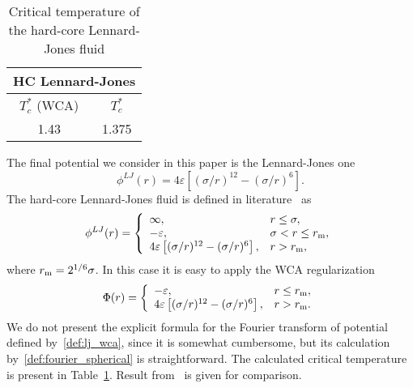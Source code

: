 \begin{table}[h]
	\noindent\caption{Critical temperature of the hard-core Lennard-Jones fluid}\vskip3mm
	\begin{tabular}{|c|c|}
		\hline
		\multicolumn{2}{|c|}{HC Lennard-Jones}\\
		\hline
		$T_c^*$ (WCA) & $T_c^*$ \cite{SowersStanley1991} \\
		\hline
		1.43 & 1.375 \\
		\hline
	\end{tabular}
	\label{tab:lj_temp_cr}
\end{table}

The final potential we consider in this paper is the Lennard-Jones one
\begin{equation*}
	\phi^{LJ}(r) = 4\varepsilon \left[(\sigma/r)^{12} - (\sigma/r)^6\right].
\end{equation*}
The hard-core Lennard-Jones fluid is defined in literature~\cite{SowersStanley1991,DiezLargoSolana2010} as
\begin{equation*}
	\phi^{LJ}(r) = \left\{
	\begin{array}{llll}
		\infty, & r\leq \sigma,
		\\
		-\varepsilon, & \sigma < r \leq r_{\rm m}, 
		\\
		4\varepsilon \left[(\sigma/r)^{12} - (\sigma/r)^6\right], & r > r_{\rm m},
	\end{array}
	\right.
\end{equation*}
where $r_{\rm m}=2^{1/6}\sigma$.
In this case it is easy to apply the WCA regularization
\begin{equation}
	\label{def:lj_wca}
	\Phi(r) = \left\{
	\begin{array}{ll}
		-\varepsilon, & r \leq r_{\rm m},
		\\
		4\varepsilon \left[(\sigma/r)^{12} - (\sigma/r)^6\right], & r > r_{\rm m}.
	\end{array}	
	\right.
\end{equation}
We do not present the explicit formula for the Fourier transform of potential defined by~\eqref{def:lj_wca}, since it is somewhat cumbersome, but its calculation by~\eqref{def:fourier_spherical} is straightforward. 
The calculated critical temperature is present in Table~\ref{tab:lj_temp_cr}. Result from~\cite{SowersStanley1991} is given for comparison.

